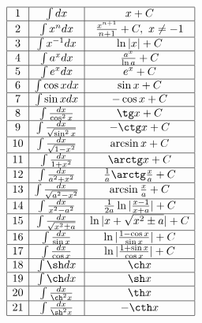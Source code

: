\documentclass{article}
\begin{document}
\begin{displaymath}
\begin{array}{|c|c|c|}
  \hline
  1 &\int dx & x + C\\
  \hline
  2 &\int x^{n}dx &\frac{x^{n+1}}{n+1} + C, ~ x \not= -1\\
  \hline
  3 &\int x^{-1}dx &\ln |x| + C\\
  \hline
  4 &\int a^{x}dx &\frac{a^x}{\ln a} + C\\
  \hline
  5 &\int e^{x}dx &e^x + C\\
  \hline
  6 &\int \cos x dx &\sin x + C\\
  \hline
  7 &\int \sin x dx &-\cos x + C\\
  \hline
  8 &\int \frac{dx}{\cos^2 x} &\tg x + C\\
  \hline
  9 &\int \frac{dx}{\sqrt{\sin^2 x}} &-\ctg x + C\\
  \hline
  10&\int \frac{dx}{\sqrt{1-x^2}} &\arcsin x + C\\
  \hline
  11&\int \frac{dx}{1+x^2} &\arctg x + C\\
  \hline
  12&\int \frac{dx}{a^2+x^2} &\frac{1}{a}\arctg \frac{x}{a} + C\\
  \hline
  13&\int \frac{dx}{\sqrt{a^2-x^2}}& \arcsin \frac{x}{a} + C\\
  \hline
  14&\int \frac{dx}{x^2-a^2} &\frac{1}{2a}\ln |\frac{x-1}{x+a}| + C\\
  \hline
  15&\int \frac{dx}{\sqrt{x^2 \pm a}} &\ln |x + \sqrt{x^2 \pm a}| + C\\
  \hline
  16&\int \frac{dx}{\sin x} &\ln |\frac{1-\cos x}{\sin x}| + C\\
  \hline
  17&\int \frac{dx}{\cos x} &\ln |\frac{1+\sin x}{\cos x}| + C\\
  \hline
  18&\int \sh dx &\ch x\\
  \hline
  19&\int \ch dx &\sh x\\
  \hline
  20&\int \frac{dx}{\ch^2 x} & {\th} x\\
  \hline
  21&\int \frac{dx}{\sh^2 x} & -\cth x\\
  \hline
\end{array}
\end{displaymath}
\end{document}
